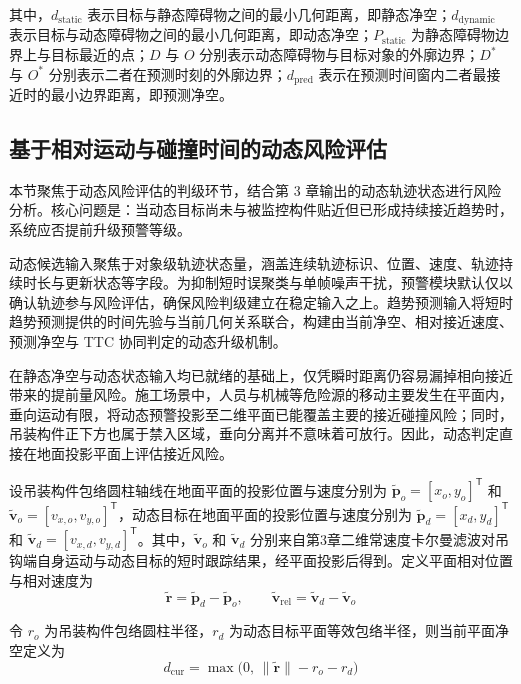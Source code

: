 其中，$d_{\mathrm{static}}$ 表示目标与静态障碍物之间的最小几何距离，即静态净空；$d_{\mathrm{dynamic}}$ 表示目标与动态障碍物之间的最小几何距离，即动态净空；$P_{\mathrm{static}}$ 为静态障碍物边界上与目标最近的点；$D$ 与 $O$ 分别表示动态障碍物与目标对象的外廓边界；$D^{*}$ 与 $O^{*}$ 分别表示二者在预测时刻的外廓边界；$d_{\mathrm{pred}}$ 表示在预测时间窗内二者最接近时的最小边界距离，即预测净空。

\subsection{基于相对运动与碰撞时间的动态风险评估}\label{subsec_ch5_risk_upgrade}

本节聚焦于动态风险评估的判级环节，结合第 3 章输出的动态轨迹状态进行风险分析。核心问题是：当动态目标尚未与被监控构件贴近但已形成持续接近趋势时，系统应否提前升级预警等级。

动态候选输入聚焦于对象级轨迹状态量，涵盖连续轨迹标识、位置、速度、轨迹持续时长与更新状态等字段。为抑制短时误聚类与单帧噪声干扰，预警模块默认仅以确认轨迹参与风险评估，确保风险判级建立在稳定输入之上。趋势预测输入将短时趋势预测提供的时间先验与当前几何关系联合，构建由当前净空、相对接近速度、预测净空与 TTC 协同判定的动态升级机制。

在静态净空与动态状态输入均已就绪的基础上，仅凭瞬时距离仍容易漏掉相向接近带来的提前量风险。施工场景中，人员与机械等危险源的移动主要发生在平面内，垂向运动有限，将动态预警投影至二维平面已能覆盖主要的接近碰撞风险；同时，吊装构件正下方也属于禁入区域，垂向分离并不意味着可放行。因此，动态判定直接在地面投影平面上评估接近风险。

设吊装构件包络圆柱轴线在地面平面的投影位置与速度分别为 $\tilde{\mathbf{p}}_o=[x_o,y_o]^\mathsf{T}$ 和 $\tilde{\mathbf{v}}_o=[v_{x,o},v_{y,o}]^\mathsf{T}$，动态目标在地面平面的投影位置与速度分别为 $\tilde{\mathbf{p}}_d=[x_d,y_d]^\mathsf{T}$ 和 $\tilde{\mathbf{v}}_d=[v_{x,d},v_{y,d}]^\mathsf{T}$。其中，$\tilde{\mathbf{v}}_o$ 和 $\tilde{\mathbf{v}}_d$ 分别来自第3章二维常速度卡尔曼滤波对吊钩端自身运动与动态目标的短时跟踪结果，经平面投影后得到。定义平面相对位置与相对速度为
\begin{equation}
\tilde{\mathbf{r}}=\tilde{\mathbf{p}}_d-\tilde{\mathbf{p}}_o,
\qquad
\tilde{\mathbf{v}}_{\mathrm{rel}}=\tilde{\mathbf{v}}_d-\tilde{\mathbf{v}}_o
\end{equation}

令 $r_o$ 为吊装构件包络圆柱半径，$r_d$ 为动态目标平面等效包络半径，则当前平面净空定义为
\begin{equation}
d_{\mathrm{cur}}=\max\bigl(0,\,\|\tilde{\mathbf{r}}\|-r_o-r_d\bigr)
\end{equation}

